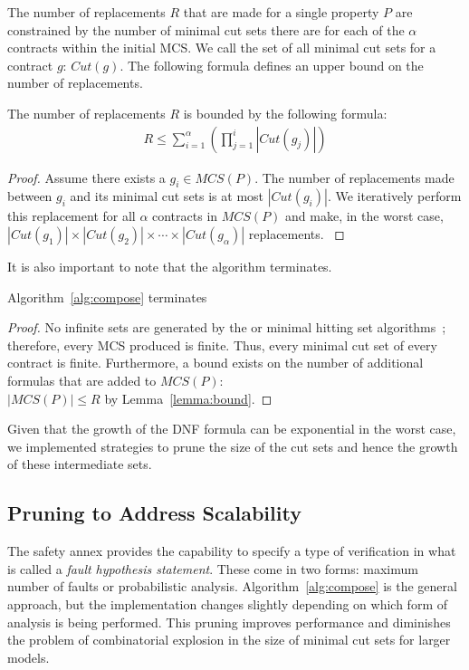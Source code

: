 The number of replacements $R$ that are made for a single property $P$ are constrained by the number of minimal cut sets there are for each of the $\alpha$ contracts within the initial MCS. We call the set of all minimal cut sets for a contract $g$: $\mathit{Cut(g)}$. The following formula defines an upper bound on the number of replacements. 

\begin{lemma}
The number of replacements $R$ is bounded by the following formula:
\begin{gather}
\label{eq:bound}
  R \leq {\displaystyle \sum_{i=1}^{\alpha} }({\displaystyle \prod_{j=1}^{i} |\mathit{Cut(g_j)}|})  
\end{gather}
\begin{proof}
Assume there exists a $g_i \in \mathit{MCS(P)}$. The number of replacements made between $g_i$ and its minimal cut sets is at most $|\mathit{Cut(g_i)}|$. We iteratively perform this replacement for all $\alpha$ contracts in $\mathit{MCS(P)}$ and make, in the worst case, $|\mathit{Cut(g_1)}| \times |\mathit{Cut(g_2)}| \times \cdots \times |\mathit{Cut(g_\alpha)}|$ replacements.
\label{lemma:bound}
\end{proof}
\end{lemma}

It is also important to note that the algorithm terminates. 
\begin{theorem}
Algorithm~\ref{alg:compose} terminates
\begin{proof}
No infinite sets are generated by the \aivcalg or minimal hitting set algorithms~\cite{Ghassabani2017EfficientGO,murakami2013efficient}; therefore, every MCS produced is finite. Thus, every minimal cut set of every contract is finite. Furthermore, a bound exists on the number of additional formulas that are added to $\mathit{MCS(P)}$: \\
$|\mathit{MCS(P)}| \leq R$ by Lemma~\ref{lemma:bound}.
\end{proof}
\end{theorem}

Given that the growth of the DNF formula can be exponential in the worst case, we implemented strategies to prune the size of the cut sets and hence the growth of these intermediate sets. 


\subsection{Pruning to Address Scalability}
The safety annex provides the capability to specify a type of verification in what is called a \textit{fault hypothesis statement}. These come in two forms: maximum number of faults or probabilistic analysis. Algorithm~\ref{alg:compose} is the general approach, but the implementation changes slightly depending on which form of analysis is being performed. This pruning improves performance and diminishes the problem of combinatorial explosion in the size of minimal cut sets for larger models. 

